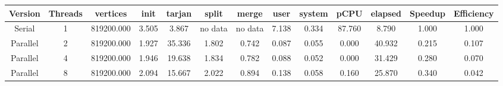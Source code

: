 \begin{tabular}{|c|c|c|c|c|c|c|c|c|c|c|c|c|}
\toprule
 Version &  Threads &   vertices &  init &  tarjan &   split &   merge &  user &  system &   pCPU &  elapsed &  Speedup &  Efficiency \\
\midrule
  Serial &        1 & 819200.000 & 3.505 &   3.867 & no data & no data & 7.138 &   0.334 & 87.760 &    8.790 &    1.000 &       1.000 \\
Parallel &        2 & 819200.000 & 1.927 &  35.336 &   1.802 &   0.742 & 0.087 &   0.055 &  0.000 &   40.932 &    0.215 &       0.107 \\
Parallel &        4 & 819200.000 & 1.946 &  19.638 &   1.834 &   0.782 & 0.088 &   0.052 &  0.000 &   31.429 &    0.280 &       0.070 \\
Parallel &        8 & 819200.000 & 2.094 &  15.667 &   2.022 &   0.894 & 0.138 &   0.058 &  0.160 &   25.870 &    0.340 &       0.042 \\
\bottomrule
\end{tabular}
